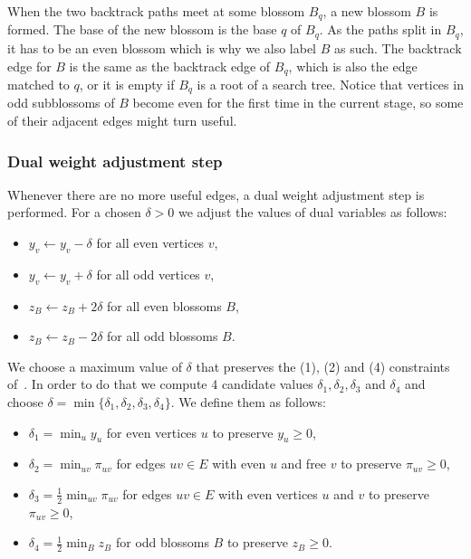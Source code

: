 When the two backtrack paths meet at some blossom $B_q$, a new blossom $B$ is formed. The base of the new blossom is the base $q$ of $B_q$. As the paths split in $B_q$, it has to be an even blossom which is why we also label $B$ as such. The backtrack edge for $B$ is the same as the backtrack edge of $B_q$, which is also the edge matched to $q$, or it is empty if $B_q$ is a root of a search tree. Notice that vertices in odd subblossoms of $B$ become even for the first time in the current stage, so some of their adjacent edges might turn useful.

\subsubsection*{Dual weight adjustment step}

Whenever there are no more useful edges, a dual weight adjustment step is performed. For a chosen $\delta > 0$ we adjust the values of dual variables as follows:

\begin{itemize}
    \item $y_v \gets y_v - \delta$ for all even vertices $v$,
    \item $y_v \gets y_v + \delta$ for all odd vertices $v$,
    \item $z_B \gets z_B + 2\delta$ for all even blossoms $B$,
    \item $z_B \gets z_B - 2\delta$ for all odd blossoms $B$.
\end{itemize}

We choose a maximum value of $\delta$ that preserves the (1), (2) and (4) constraints of~. In order to do that we compute 4 candidate values $\delta_1, \delta_2, \delta_3$ and $\delta_4$ and choose $\delta = \min \{\delta_1, \delta_2, \delta_3, \delta_4\}$. We define them as follows:

\begin{itemize}
    \item $\delta_1 = \min_{u} y_u$ for even vertices $u$ to preserve $y_u \geq 0$,
    \item $\delta_2 = \min_{uv} \pi_{uv}$ for edges $uv \in E$ with even $u$ and free $v$ to preserve $\pi_{uv} \geq 0$,
    \item $\delta_3 = \frac{1}{2}\min_{uv} \pi_{uv}$ for edges $uv \in E$ with even vertices $u$ and $v$ to preserve $\pi_{uv} \geq 0$,
    \item $\delta_4 = \frac{1}{2}\min_{B} z_B$ for odd blossoms $B$ to preserve $z_B \geq 0$.
\end{itemize}

